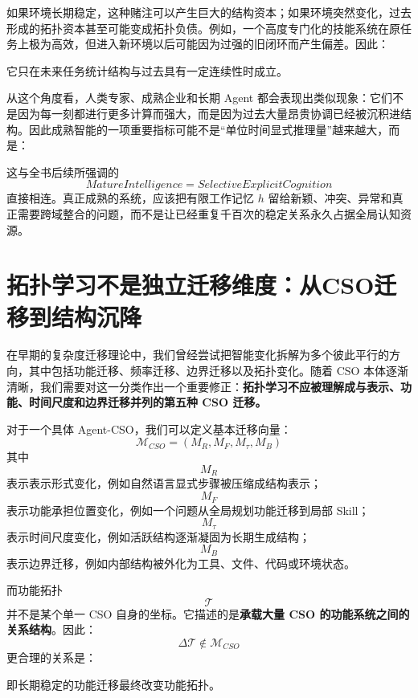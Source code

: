 如果环境长期稳定，这种赌注可以产生巨大的结构资本；如果环境突然变化，过去形成的拓扑资本甚至可能变成拓扑负债。例如，一个高度专门化的技能系统在原任务上极为高效，但进入新环境以后可能因为过强的旧闭环而产生偏差。因此：
\begin{statementbox}
\centering
{}
\end{statementbox}

它只在未来任务统计结构与过去具有一定连续性时成立。

从这个角度看，人类专家、成熟企业和长期 Agent 都会表现出类似现象：它们不是因为每一刻都进行更多计算而强大，而是因为过去大量昂贵协调已经被沉积进结构。因此成熟智能的一项重要指标可能不是``单位时间显式推理量''越来越大，而是：
\begin{statementbox}
\centering
{}
\end{statementbox}

这与全书后续所强调的
\[
MatureIntelligence
=
SelectiveExplicitCognition
\]
直接相连。真正成熟的系统，应该把有限工作记忆 $h$ 留给新颖、冲突、异常和真正需要跨域整合的问题，而不是让已经重复千百次的稳定关系永久占据全局认知资源。


\section{拓扑学习不是独立迁移维度：从CSO迁移到结构沉降}

在早期的复杂度迁移理论中，我们曾经尝试把智能变化拆解为多个彼此平行的方向，其中包括功能迁移、频率迁移、边界迁移以及拓扑变化。随着 CSO 本体逐渐清晰，我们需要对这一分类作出一个重要修正：\textbf{拓扑学习不应被理解成与表示、功能、时间尺度和边界迁移并列的第五种 CSO 迁移。}

对于一个具体 Agent-CSO，我们可以定义基本迁移向量：
\[
\boxed{
\mathcal{M}_{CSO}
=
\left(
M_R,
M_F,
M_\tau,
M_B
\right)
}
\]
其中
\[
M_R
\]
表示表示形式变化，例如自然语言显式步骤被压缩成结构表示；
\[
M_F
\]
表示功能承担位置变化，例如一个问题从全局规划功能迁移到局部 Skill；
\[
M_\tau
\]
表示时间尺度变化，例如活跃结构逐渐凝固为长期生成结构；
\[
M_B
\]
表示边界迁移，例如内部结构被外化为工具、文件、代码或环境状态。

而功能拓扑
\[
\mathcal{T}
\]
并不是某个单一 CSO 自身的坐标。它描述的是\textbf{承载大量 CSO 的功能系统之间的关系结构}。因此：
\[
\boxed{
\Delta\mathcal{T}
\notin
\mathcal M_{CSO}
}
\]
更合理的关系是：
\begin{statementbox}
\centering
{}
\end{statementbox}
即长期稳定的功能迁移最终改变功能拓扑。

